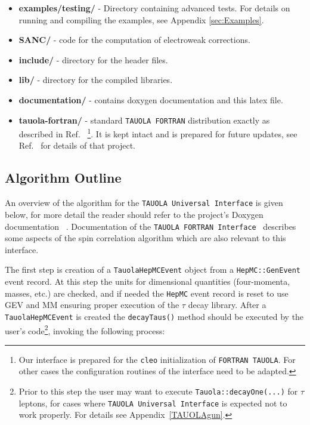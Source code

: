 \documentclass[]{Tauola_interface_design}
\begin{document}
\begin{itemize}
\begin{itemize}
    \end{itemize}   
  \item {\bf examples/testing/} - Directory containing advanced tests. For details on running and compiling the examples, see Appendix \ref{sec:Examples}.

  \item {\bf SANC/} - code for the computation of  electroweak corrections.
  \item {\bf include/} - directory for the header files.
  \item {\bf lib/ } - directory for the compiled  libraries. 
  \item {\bf documentation/ } - contains doxygen documentation and this latex file.
  \item {\bf tauola-fortran/ } - standard  {\tt TAUOLA FORTRAN} distribution 
exactly as described in Ref.~\cite{Golonka:2003xt}%
\footnote{ Our interface is prepared for the {\tt cleo} initialization of  
{\tt FORTRAN TAUOLA}. For other cases
the configuration routines of the interface need to be adapted.}.
It is kept intact and is prepared for future updates, see
Ref.~\cite{Actis:2010gg} for details of that project.
\end{itemize}

\subsection{Algorithm Outline}
\label{sect:Outline}

An overview of the algorithm for  the {\tt TAUOLA Universal Interface} is
given below,  for more detail the reader
should refer to the project's Doxygen documentation ~\cite{tauolaC++}.
Documentation of the  {\tt TAUOLA FORTRAN Interface}~\cite{Golonka:2003xt} 
describes some aspects of the spin
correlation algorithm which are also relevant to this interface.


The first step is creation of a {\tt TauolaHepMCEvent} object from
a {\tt HepMC::GenEvent} event record. At this step the units for dimensional
quantities (four-momenta, masses, etc.) are checked, and if needed the {\tt HepMC} event record is
reset to use GEV and MM ensuring proper execution of the $\tau$ decay library.
 After a {\tt TauolaHepMCEvent} is created the
{\tt decayTaus()} method should be executed by the user's code\footnote{Prior to this step
the user may want to execute {\tt Tauola::decayOne(...)} for $\tau$ leptons, for cases where {\tt TAUOLA Universal Interface} is 
expected not to work properly. For details see Appendix~\ref{TAUOLAgun}.
},
invoking the following process:
\end{document}
